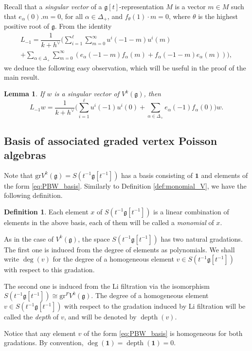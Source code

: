\documentclass[JEP,XML,SOM,Unicode]{cedram}
\let\oldvee\vee
\renewcommand{\vee}{{\scriptscriptstyle\oldvee}}
\let\al\alpha
\DeclareMathOperator{\dep}{depth}
\newcommand \g{\mathfrak g}
\newcommand\gr{\mathrm{gr}V^{k}({\mathfrak g})}
\newtheorem{lem}[theorem]{Lemma}
\theoremstyle{definition}
\newtheorem{defn}[theorem]{Definition}
\begin{document}
Recall that a \emph{singular vector} of a $\g[t]$-representation $M$
is a vector $m \in M$
such that $e_{\alpha}(0).m=0$, for all $\alpha \in {\Delta}_{+}$,
and $f_\theta(1)\cdot m=0$, where $\theta$ is the highest positive root of $\g$.
From the identity
\begin{multline*}
L_{-1}=
\dfrac{1}{k+h^\vee} \biggl(\sum_{i=1}^{\ell}\sum_{m=0}^{\infty} u^i(-1-m) u^i(m)\\[-8pt]
+\sum_{\al\in{\Delta}_{+}}\sum_{m=0}^{\infty}
(e_{\al}(-1-m)f_{\al}(m)+f_{\al}(-1-m)e_{\al}(m))\biggr),
\end{multline*}
we deduce the following easy observation, which will be useful
in the proof of the main result.

\begin{lem}
\label{lem:Sugawara_singular_vector}
If $w$ is a singular vector of $V^k(\g)$,
then
\[
L_{-1} w=\dfrac{1}{k+h^\vee} \biggl(\sum_{i=1}^{\ell}u^i(-1)u^i(0)
+\sum_{\al\in{\Delta}_{+}}e_{\al}(-1)f_{\al}(0)\biggr) w.
\]
\end{lem}
\subsection{Basis of associated graded vertex Poisson algebras}

Note that $\gr=S(t^{-1}\g[t^{-1}])$ has a basis consisting
of $\mathbf{1}$ and elements of the form \eqref{eq:PBW_basis}.
Similarly to Definition \ref{def:monomial_V}, we have the following
definition.

\begin{defn}
\label{def:monomial_S}
Each element $x$ of $S(t^{-1}\g[t^{-1}])$
is a linear combination of elements in the above basis,
each of them will be called a \emph{monomial} of $x$.
\end{defn}

{As in the case of $V^k(\g)$,}
the space $S(t^{-1}\g[t^{-1}])$ has two natural gradations.
The first one is induced from the degree of elements as
polynomials.
We shall write $\deg(v)$ for the degree of a homogeneous
element $v \in S(t^{-1}\g[t^{-1}])$ with respect to this gradation.

The second one is induced from the Li filtration via the isomorphism
$S(t^{-1}\g[t^{-1}]) \cong \mathrm{gr}^F V^k(\g)$.
The degree of a homogeneous
element $v \in S(t^{-1}\g[t^{-1}])$ with respect to the gradation
induced by Li filtration
will be called the \emph{depth} of $v$, and will be denoted by $\dep(v)$.

Notice that any element $v$ of the form \eqref{eq:PBW_basis} is homogeneous
for both gradations.
By convention, $\deg(\mathbf{1})=\dep(\mathbf{1})=0$.
\end{document}
